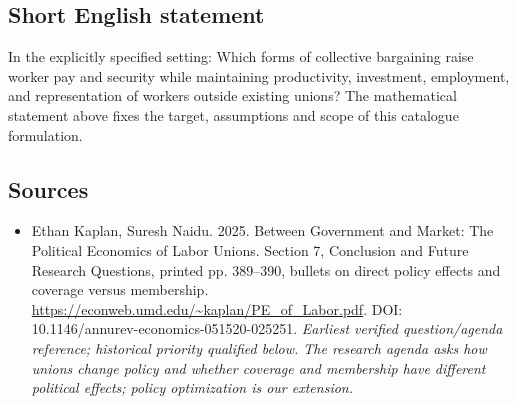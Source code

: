 \documentclass[11pt]{article}
\begin{document}
\subsection{Short English statement}
In the explicitly specified setting: Which forms of collective bargaining raise worker pay and security while maintaining productivity, investment, employment, and representation of workers outside existing unions? The mathematical statement above fixes the target, assumptions and scope of this catalogue formulation.

\subsection{Sources}
\begin{itemize}\raggedright
\item[\textnormal{[S1]}]\hypertarget{source:30007636:1}{} Ethan Kaplan, Suresh Naidu. 2025. Between Government and Market: The Political Economics of Labor Unions. Section 7, Conclusion and Future Research Questions, printed pp. 389–390, bullets on direct policy effects and coverage versus membership.
\url{https://econweb.umd.edu/~kaplan/PE_of_Labor.pdf}.
DOI: 10.1146/annurev-economics-051520-025251.
{\small\textit{Earliest verified question/agenda reference; historical priority qualified below. The research agenda asks how unions change policy and whether coverage and membership have different political effects; policy optimization is our extension.}}
\end{itemize}
\end{document}
